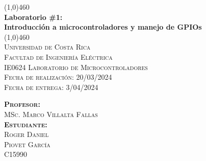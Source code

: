\begin{titlepage}    
    \begin{center}
        \line(1,0){460}\\
        [5mm]
        \huge{\bfseries Laboratorio \#1:\\ Introducción a microcontroladores y manejo de GPIOs}\\
        \line(1,0){460}\\
        [2.5cm]
        \textsc{\Large Universidad de Costa Rica\\Facultad de Ingeniería Eléctrica\\IE0624 Laboratorio de Microcontroladores}\\
        \textsc{\Large Fecha de realización: 20/03/2024}\\
        \textsc{\Large Fecha de entrega: 3/04/2024}\\
        \vspace{2.5cm}
        \begin{flushleft}
            \textsc{\large 
            \textbf{Profesor:}\\ MSc. Marco Villalta Fallas\\[2mm]
            \textbf{Estudiante:}\\ Roger Daniel\\Piovet García\\[2mm]C15990\\}
        \end{flushleft}
    \end{center}
\end{titlepage}
\restoregeometry
